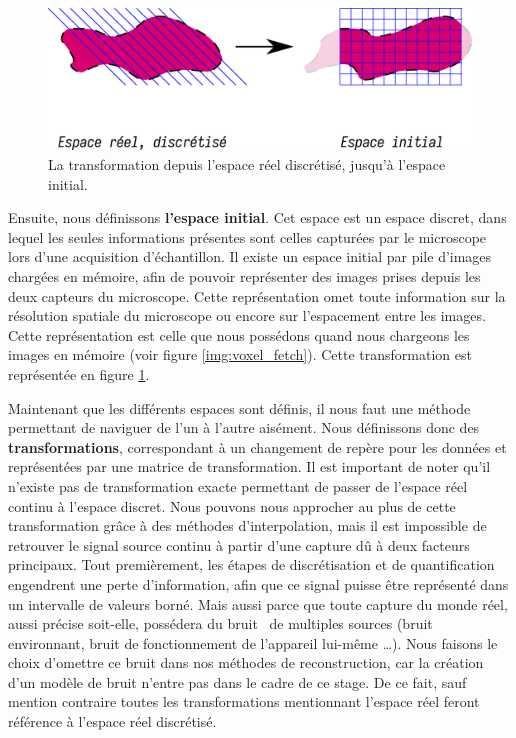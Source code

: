 {{{            \begin{figure}[h]
                \centering
                \includegraphics[width=.8\linewidth]{img/spaces_transfo_discrete2initial.png}
                \captionsetup{width=.8\linewidth}
                \caption{La transformation depuis l'espace réel discrétisé, jusqu'à l'espace initial.}
                \label{img:spaces_transfo:discrete_to_initial}
            \end{figure}

            Ensuite, nous définissons \textbf{l'espace initial}. Cet espace est un espace discret, dans lequel les seules informations présentes sont celles capturées par le microscope lors d'une acquisition d'échantillon. Il existe un espace initial par pile d'images chargées en mémoire, afin de pouvoir représenter des images prises depuis les deux capteurs du microscope. Cette représentation omet toute information sur la résolution spatiale du microscope ou encore sur l'espacement entre les images. Cette représentation est celle que nous possédons quand nous chargeons les images en mémoire (voir figure \ref{img:voxel_fetch}). Cette transformation est représentée en figure \ref{img:spaces_transfo:discrete_to_initial}.

            Maintenant que les différents espaces sont définis, il nous faut une méthode permettant de naviguer de l'un à l'autre aisément. Nous définissons donc des \textbf{transformations}, correspondant à un changement de repère pour les données et représentées par une matrice de transformation. Il est important de noter qu'il n'existe pas de transformation exacte permettant de passer de l'espace réel continu à l'espace discret. Nous pouvons nous approcher au plus de cette transformation grâce à des méthodes d'interpolation, mais il est impossible de retrouver le signal source continu à partir d'une capture dû à deux facteurs principaux. Tout premièrement, les étapes de discrétisation et de quantification engendrent une perte d'information, afin que ce signal puisse être représenté dans un intervalle de valeurs borné. Mais aussi parce que toute capture du monde réel, aussi précise soit-elle, possédera du bruit~\cite{cite_noise_capture} de multiples sources (bruit environnant, bruit de fonctionnement de l'appareil lui-même \ldots). Nous faisons le choix d'omettre ce bruit dans nos méthodes de reconstruction, car la création d'un modèle de bruit n'entre pas dans le cadre de ce stage. De ce fait, sauf mention contraire toutes les transformations mentionnant l'espace réel feront référence à l'espace réel discrétisé. %

}}}
